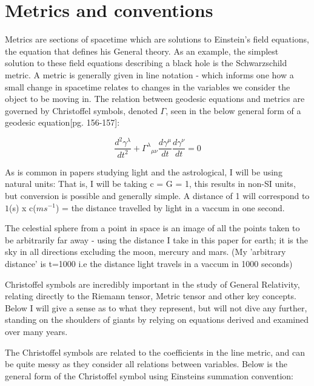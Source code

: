 \documentclass[oneside,openright,frontopenright, singlespacing]{dmathesis}
\begin{document}
\section{Metrics and conventions}

\vspace{1em}
	Metrics are sections of spacetime which are solutions to Einstein’s field equations, the equation that defines his General theory. As an example, the simplest solution to these field equations describing a black hole is the Schwarzschild metric. A metric is generally given in line notation - which informs one how a small change in spacetime relates to changes in the variables we consider the object to be moving in. The relation between geodesic equations and metrics are governed by Christoffel symbols, denoted $\Gamma$, seen in the below general form of a geodesic equation[pg. 156-157]\cite{schutz2009first}:  

	\[\frac{d^2 \gamma^\lambda}{dt^2} + {\Gamma^\lambda}_{\mu\nu} \frac{d\gamma^\mu}{dt} \frac{d\gamma^\nu}{dt} = 0\]

\vspace{1em}
	As is common in papers studying light and the astrological, I will be using natural units: That is, I will be taking c = G = 1, this results in non-SI units, but conversion is possible and generally simple. A distance of 1 will correspond to $1$(s) x c($ms^{-1}$) = the distance travelled by light in a vaccum in one second.

\vspace{1em}
	The celestial sphere from a point in space is an image of all the points taken to be arbitrarily far away - using the distance I take in this paper for earth; it is the sky in all directions excluding the moon, mercury and mars. (My 'arbitrary distance' is t=1000 i.e the distance light travels in a vaccum in 1000 seconds)

\vspace{1em}
	Christoffel symbols are incredibly important in the study of General Relativity, relating directly to the Riemann tensor, Metric tensor and other key concepts. Below I will give a sense as to what they represent, but will not dive any further, standing on the shoulders of giants by relying on equations derived and examined over many years.

\vspace{1em}
	The Christoffel symbols are related to the coefficients in the line metric, and can be quite messy as they consider all relations between variables. Below is the general form of the Christoffel symbol using Einsteins summation convention\cite[pg. 13-14]{albert1916foundation}:
	
\end{document}
